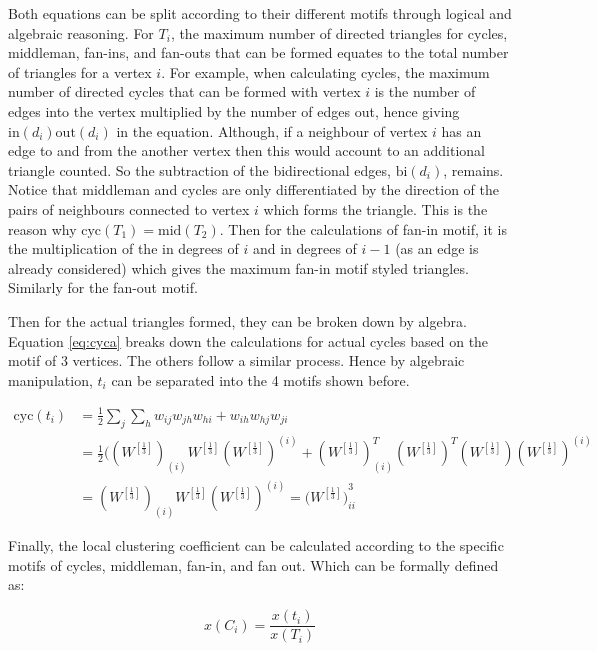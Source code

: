 Both equations can be split according to their different motifs through logical and algebraic reasoning. For $T_i$, the maximum number of directed triangles for cycles, middleman, fan-ins, and fan-outs that can be formed equates to the total number of triangles for a vertex $i$. For example, when calculating cycles, the maximum number of directed cycles that can be formed with vertex $i$ is the number of edges into the vertex multiplied by the number of edges out, hence giving $\text{in}(d_i)\text{out}(d_i)$ in the equation. Although, if a neighbour of vertex $i$ has an edge to and from the another vertex then this would account to an additional triangle counted. So the subtraction of the bidirectional edges,  $\text{bi}(d_i)$, remains. Notice that middleman and cycles are only differentiated by the direction of the pairs of neighbours connected to vertex $i$ which forms the triangle. This is the reason why $\text{cyc}(T_1) = \text{mid}(T_2)$. Then for the calculations of fan-in motif, it is the multiplication of the in degrees of $i$ and in degrees of $i - 1$ (as an edge is already considered) which gives the maximum fan-in motif styled triangles. Similarly for the fan-out motif.

Then for the actual triangles formed, they can be broken down by algebra. Equation \ref{eq:cyca} breaks down the calculations for actual cycles based on the motif of 3 vertices. The others follow a similar process. Hence by algebraic manipulation, $t_i$ can be separated into the 4 motifs shown before.

\begin{align} \label{eq:cyca}
\text{cyc}(t_i) &= \frac{1}{2}\sum_j\sum_h{w_{ij}w_{jh}w_{hi} + w_{ih}w_{hj}w_{ji}} \\
&= \frac{1}{2}((W^{[\frac{1}{3}]})_{(i)}W^{[\frac{1}{3}]}(W^{[\frac{1}{3}]})^{(i)} + (W^{[\frac{1}{3}]})_{(i)}^T(W^{[\frac{1}{3}]})^T(W^{[\frac{1}{3}]})(W^{[\frac{1}{3}]})^{(i)}  \nonumber \\
&= (W^{[\frac{1}{3}]})_{(i)}W^{[\frac{1}{3}]}(W^{[\frac{1}{3}]})^{(i)} = ({W^{[\frac{1}{3}]})}^3_{ii} \nonumber
\end{align}

Finally, the local clustering coefficient can be calculated according to the specific motifs of cycles, middleman, fan-in, and fan out. Which can be formally defined as:

\begin{equation} \label{eq:wdmcc}
x(C_i) = \frac{x(t_i)}{x(T_i)}
\end{equation}

